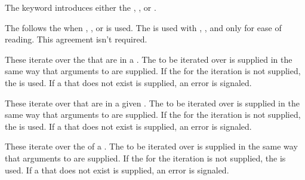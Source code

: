  
The keyword  introduces either the {\LoopSchema} 
, ,  or .
 
 
The  
follows the   when , 
, or  is used.  
The   is used with , 
, and  only for ease of reading.
This agreement isn't required.
 
 
These {\LoopSchemas} iterate over the  
that are  in a .
The  to be iterated over is supplied in the same way
that  arguments to  are supplied.  
If the  for the iteration is not supplied, 
the  is used.  
If a  that does not exist is supplied, 
an error  is signaled.
 
 
These {\LoopSchemas} iterate over  that are
 in a given .  
The  to be iterated over is supplied in the same way
that  arguments to  are supplied.
If the  for the iteration is not supplied, 
the  is used.
If a  that does not exist is supplied, 
an error  is signaled.
 
 
These {\LoopSchemas} iterate over the  of a .
The  to be iterated over is supplied in the same way
that  arguments to  are supplied.
If the  for the iteration is not supplied, 
the  is used.
If a  that does not exist is supplied, 
an error  is signaled.
 
